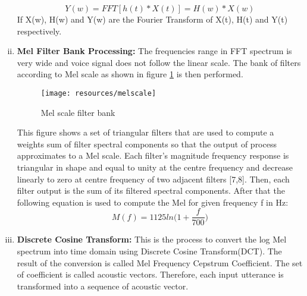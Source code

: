 \begin{enumerate}[(i)]
                \begin{equation}
                        Y(w) = FFT[h(t)*X(t)] = H(w) * X(w)
                \end{equation}
                If X(w), H(w) and Y(w) are the Fourier Transform of X(t), H(t) and Y(t) respectively.
        \item \textbf{Mel Filter Bank Processing:}
                The frequencies range in FFT spectrum is very wide and voice signal does not follow the linear scale. The bank of filters according to Mel
                scale as shown in figure \ref{fig:Melscale} is then performed.
                \begin{figure}[h!]
                        \centering
                        \texttt{[image: resources/melscale]}
                        \caption{Mel scale filter bank}
                        \label{fig:Melscale}
                \end{figure}
                This figure shows a set of triangular filters that are used to compute a weights sum of filter spectral components so that the output
                of process approximates to a Mel scale. Each filter's magnitude frequency response is triangular in shape and equal to unity at the
                centre frequency and decrease linearly to zero at centre frequency of two adjacent filters [7,8]. Then, each filter output is the sum of its
                filtered spectral components. After that the following equation is used to compute the Mel for given frequency f in Hz:
                \begin{equation}
                        M(f) = 1125ln\Big(1+\frac{f}{700}\Big)
                \end{equation}
        \item \textbf{Discrete Cosine Transform:}
                This is the process to convert the log Mel spectrum into time domain using Discrete Cosine Transform(DCT). The result of the conversion is
                called Mel Frequency Cepstrum Coefficient. The set of coefficient is called acoustic vectors. Therefore, each input utterance is transformed
                into a sequence of acoustic vector.
\end{enumerate}

